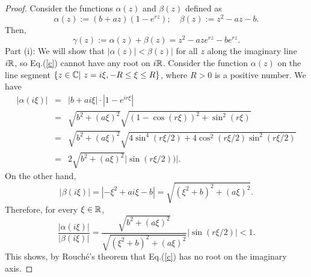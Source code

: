 \documentclass[12pt,letterpaper]{amsart}
\theoremstyle{definition}
\theoremstyle{remark}
\numberwithin{equation}{section}
\begin{document}
\begin{proof}
Consider the functions $\alpha (z)$ and $\beta (z)$ defined as
$$
\alpha (z):= (b+az) (1-e^{rz} ); \quad  \beta (z):= z^2-az-b .
$$
Then,
$$
\gamma (z):= \alpha (z)+\beta (z) = z^2 -aze^{rz}-be^{rz}.
$$
Part (i): We will show that  $|\alpha (z)| < \beta (z)|$ for all $z$ along the imaginary line $i\mathbb R$, so Eq.(\ref{c}) cannot have any root on $i\mathbb R$.
Consider the function $\alpha (z)$ on the line segment $\{ z\in \mathbb C | \ z=i\xi, -R \le \xi \le R\}$, where $R>0$ is a positive number. We have
\begin{eqnarray}
|\alpha (i\xi ) | &=& |b+ai\xi|\cdot |1-e^{ir\xi}| \nonumber \\
&=& \sqrt{b^2+(a\xi)^2}  \sqrt { (1-\cos (r\xi ))^2+\sin^2(r\xi )} \nonumber \\
&=&  \sqrt{b^2+(a\xi)^2} \sqrt { 4\sin^4 (r\xi /2)+4\cos^2(r\xi/2)\sin^2(r\xi /2)}  \nonumber \\
&=& 2  \sqrt{b^2+(a\xi)^2}  |\sin (r\xi /2)) | . \label {hc}
\end{eqnarray}
On the other hand,
\begin{equation}
|\beta (i\xi )|= |-\xi^2 +ai\xi -b| =\sqrt{(\xi^2+b)^2+(a\xi)^2}  .
\end{equation}
Therefore, for every $\xi\in\mathbb R$,
\begin{equation}\label{l}
\frac{|\alpha (i\xi )|}{|\beta (i\xi )|} = \frac{\sqrt{b^2+(a\xi)^2} }{\sqrt{(\xi^2+b)^2+(a\xi)^2}}|\sin (r\xi /2)| <1.
\end{equation}
 This shows, by Rouché's theorem that Eq.(\ref{c}) has no root on the imaginary axis.


\end{proof}
\end{document}
